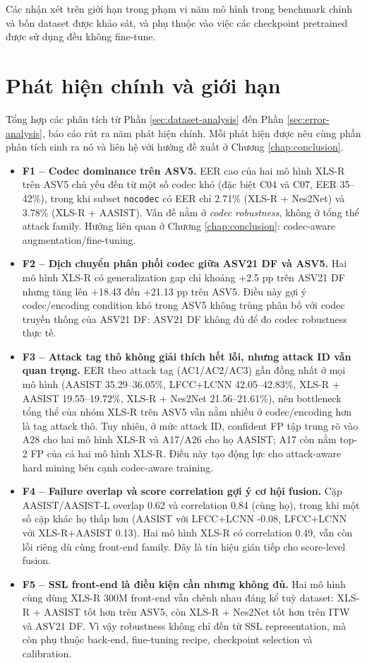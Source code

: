 Các nhận xét trên giới hạn trong phạm vi năm mô hình trong benchmark chính và bốn dataset được khảo sát, và phụ thuộc vào việc các checkpoint pretrained được sử dụng đều không fine-tune.

\section{Phát hiện chính và giới hạn}

Tổng hợp các phân tích từ Phần \ref{sec:dataset-analysis} đến Phần \ref{sec:error-analysis}, báo cáo rút ra năm phát hiện chính. Mỗi phát hiện được nêu cùng phần phân tích sinh ra nó và liên hệ với hướng đề xuất ở Chương \ref{chap:conclusion}.

\begin{itemize}
    \item \textbf{F1 -- Codec dominance trên ASV5.} EER cao của hai mô hình XLS-R trên ASV5 chủ yếu đến từ một số codec khó (đặc biệt C04 và C07, EER 35--42\%), trong khi subset \texttt{nocodec} có EER chỉ 2.71\% (XLS-R + Nes2Net) và 3.78\% (XLS-R + AASIST). Vấn đề nằm ở \textit{codec robustness}, không ở tổng thể attack family. Hướng liên quan ở Chương \ref{chap:conclusion}: codec-aware augmentation/fine-tuning.
    \item \textbf{F2 -- Dịch chuyển phân phối codec giữa ASV21 DF và ASV5.} Hai mô hình XLS-R có generalization gap chỉ khoảng +2.5 pp trên ASV21 DF nhưng tăng lên +18.43 đến +21.13 pp trên ASV5. Điều này gợi ý codec/encoding condition khó trong ASV5 không trùng phân bố với codec truyền thống của ASV21 DF: ASV21 DF không đủ để đo codec robustness thực tế.
    \item \textbf{F3 -- Attack tag thô không giải thích hết lỗi, nhưng attack ID vẫn quan trọng.} EER theo attack tag (AC1/\allowbreak AC2/\allowbreak AC3) gần đồng nhất ở mọi mô hình (AASIST 35.29--36.05\%, LFCC+LCNN 42.05--42.83\%, XLS-R + AASIST 19.55--19.72\%, XLS-R + Nes2Net 21.56--21.61\%), nên bottleneck tổng thể của nhóm XLS-R trên ASV5 vẫn nằm nhiều ở codec/encoding hơn là tag attack thô. Tuy nhiên, ở mức attack ID, confident FP tập trung rõ vào A28 cho hai mô hình XLS-R và A17/A26 cho họ AASIST; A17 còn nằm top-2 FP của cả hai mô hình XLS-R. Điều này tạo động lực cho attack-aware hard mining bên cạnh codec-aware training.
    \item \textbf{F4 -- Failure overlap và score correlation gợi ý cơ hội fusion.} Cặp AASIST/AASIST-L overlap 0.62 và correlation 0.84 (cùng họ), trong khi một số cặp khác họ thấp hơn (AASIST với LFCC+LCNN -0.08, LFCC+LCNN với XLS-R+AASIST 0.13). Hai mô hình XLS-R có correlation 0.49, vẫn còn lỗi riêng dù cùng front-end family. Đây là tín hiệu gián tiếp cho score-level fusion.
    \item \textbf{F5 -- SSL front-end là điều kiện cần nhưng không đủ.} Hai mô hình cùng dùng XLS-R 300M front-end vẫn chênh nhau đáng kể tuỳ dataset: XLS-R + AASIST tốt hơn trên ASV5, còn XLS-R + Nes2Net tốt hơn trên ITW và ASV21 DF. Vì vậy robustness không chỉ đến từ SSL representation, mà còn phụ thuộc back-end, fine-tuning recipe, checkpoint selection và calibration.
\end{itemize}

